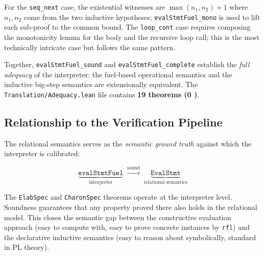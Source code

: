 \noindent
For the \texttt{seq\_next} case, the existential witnesses are
$\max(n_1, n_2) + 1$ where $n_1, n_2$ come from the two inductive
hypotheses; \texttt{evalStmtFuel\_mono} is used to lift each sub-proof
to the common bound.
The \texttt{loop\_cont} case requires composing the monotonicity lemma for
the body and the recursive loop call; this is the most technically intricate
case but follows the same pattern.

Together, \texttt{evalStmtFuel\_sound} and \texttt{evalStmtFuel\_complete}
establish the \emph{full adequacy} of the interpreter: the fuel-based
operational semantics and the inductive big-step semantics are extensionally
equivalent. The \texttt{Translation/Adequacy.lean} file contains
\textbf{19 theorems (0 \sorry)}.

\subsection{Relationship to the Verification Pipeline}

The relational semantics serves as the \emph{semantic ground truth} against
which the interpreter is calibrated:

\[
  \underbrace{\texttt{evalStmtFuel}}_{\text{interpreter}}
  \;\overset{\text{sound}}{\longrightarrow}\;
  \underbrace{\texttt{EvalStmt}}_{\text{relational semantics}}
\]

The \texttt{ElabSpec} and \texttt{CharonSpec} theorems operate at the
interpreter level. Soundness guarantees that any property proved there
also holds in the relational model. This closes the semantic gap between
the constructive evaluation approach (easy to compute with, easy to prove
concrete instances by \texttt{rfl}) and the declarative inductive semantics
(easy to reason about symbolically, standard in PL theory).
